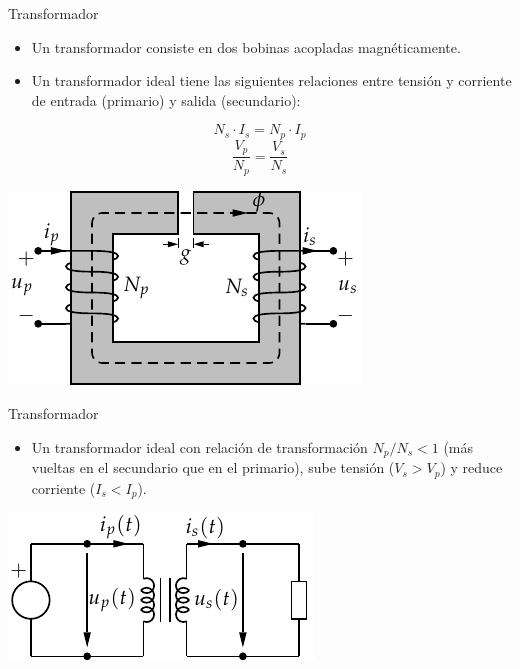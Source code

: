 \documentclass[xcolor={usenames,svgnames,dvipsnames}]{beamer}
\begin{document}
\begin{frame}[label={sec:orgaeda8c7}]{Transformador}
\begin{itemize}
\item Un transformador consiste en dos bobinas acopladas magnéticamente.

\item Un transformador ideal tiene las siguientes relaciones entre tensión
y corriente de entrada (primario) y salida (secundario):
\end{itemize}

$$N_{s}\cdot I_{s}=N_{p}\cdot I_{p}$$
$$\frac{V_{p}}{N_{p}}=\frac{V_{s}}{N_{s}}$$

\begin{center}
\includegraphics[height=0.3\textheight]{../figs/Transformador2.pdf}
\end{center}
\end{frame}

\begin{frame}[label={sec:org00c7e0e}]{Transformador}
\begin{itemize}
\item Un transformador ideal con relación de transformación \(N_{p}/N_{s}<1\)
(más vueltas en el secundario que en el primario), sube tensión
(\(V_{s}>V_{p}\)) y reduce corriente (\(I_{s}<I_{p}\)).
\end{itemize}

\begin{center}
\includegraphics[width=.9\linewidth]{../figs/Transformador.pdf}
\end{center}
\end{frame}
\end{document}
